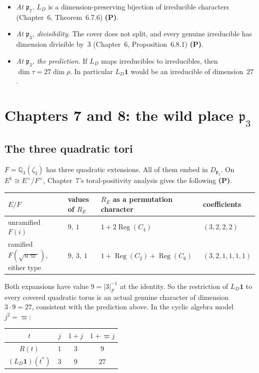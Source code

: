 \documentclass[11pt]{article}
\newcommand{\Q}{\mathbb Q}
\newcommand{\p}{\mathfrak p}
\newcommand{\Reg}{\operatorname{Reg}}
\newcommand{\Ptag}{\textbf{(P)}}
\theoremstyle{definition}
\begin{document}
\begin{itemize}
\item \emph{At $\p_7$.} $L_D$ is a dimension-preserving bijection of
irreducible characters (Chapter~6, Theorem~6.7.6) \Ptag.
\item \emph{At $\p_3$, divisibility.} The cover does not split, and
every genuine irreducible has dimension divisible by~$3$ (Chapter~6,
Proposition~6.8.1) \Ptag.
\item \emph{At $\p_3$, the prediction.} If $L_D$ maps irreducibles to
irreducibles, then $\dim\tau=27\dim\rho$. In particular $L_D\mathbf1$
would be an irreducible of dimension~$27$.
\end{itemize}

\section{Chapters 7 and 8: the wild place $\p_3$}
\subsection*{The three quadratic tori}
$F=\Q_3(\zeta_3)$ has three quadratic extensions. All of them embed in
$D_{\p_3}$. On $E^1\cong E^\times/F^\times$, Chapter~7's
toral-positivity analysis gives the following \Ptag.

\begin{center}
\begin{tabular}{@{}llll@{}}
\toprule
$E/F$ & values of $R_E$ & $R_E$ as a permutation character & coefficients\\\midrule
unramified $F(i)$ & $9,\ 1$ & $1+2\Reg(C_4)$ & $(3,2,2,2)$\\
ramified $F(\sqrt{u\varpi})$, either type & $9,\ 3,\ 1$ & $1+\Reg(C_2)+\Reg(C_6)$ & $(3,2,1,1,1,1)$\\
\bottomrule
\end{tabular}
\end{center}

Both expansions have value $9=|3|_F^{-1}$ at the identity. So the
restriction of $L_D\mathbf1$ to every covered quadratic torus is an
actual genuine character of dimension $3\cdot9=27$, consistent with the
prediction above. In the cyclic algebra model $j^2=\varpi$:
\begin{center}
\begin{tabular}{@{}cccc@{}}
\toprule
$t$ & $j$ & $1+j$ & $1+\varpi j$\\\midrule
$R(t)$ & $1$ & $3$ & $9$\\
$(L_D\mathbf1)(t^*)$ & $3$ & $9$ & $27$\\
\bottomrule
\end{tabular}
\end{center}
\end{document}
